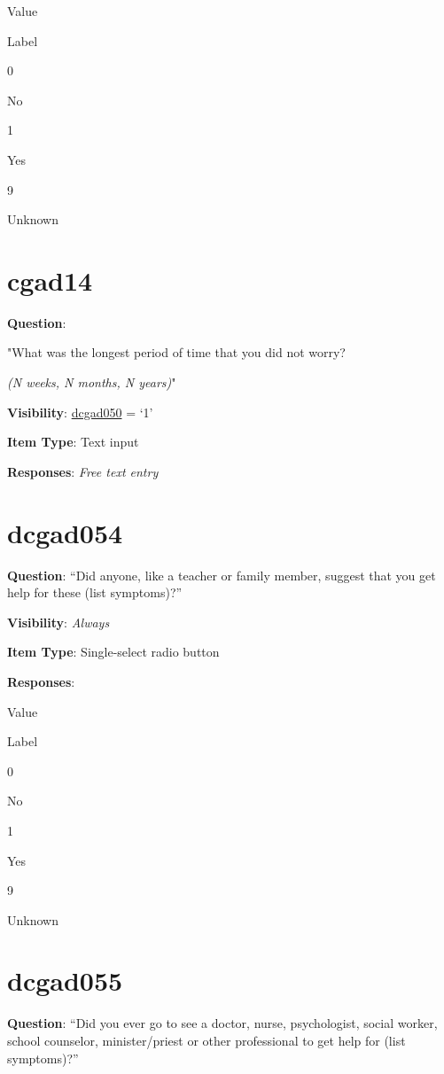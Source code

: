 \documentclass[]{book}
\begin{document}
Value

Label

0

No

1

Yes

9

Unknown

\hypertarget{cgad14}{%
\section{cgad14}\label{cgad14}}

\textbf{Question}:

"What was the longest period of time that you did not worry?

\emph{(N weeks, N months, N years)}"

\textbf{Visibility}: \protect\hyperlink{dcgad050}{dcgad050} = `1'

\textbf{Item Type}: Text input

\textbf{Responses}: \emph{Free text entry}

\hypertarget{dcgad054}{%
\section{dcgad054}\label{dcgad054}}

\textbf{Question}: ``Did anyone, like a teacher or family member, suggest that you get help for these (list symptoms)?''

\textbf{Visibility}: \emph{Always}

\textbf{Item Type}: Single-select radio button

\textbf{Responses}:

Value

Label

0

No

1

Yes

9

Unknown

\hypertarget{dcgad055}{%
\section{dcgad055}\label{dcgad055}}

\textbf{Question}: ``Did you ever go to see a doctor, nurse, psychologist, social worker, school counselor, minister/priest or other professional to get help for (list symptoms)?''
\end{document}
